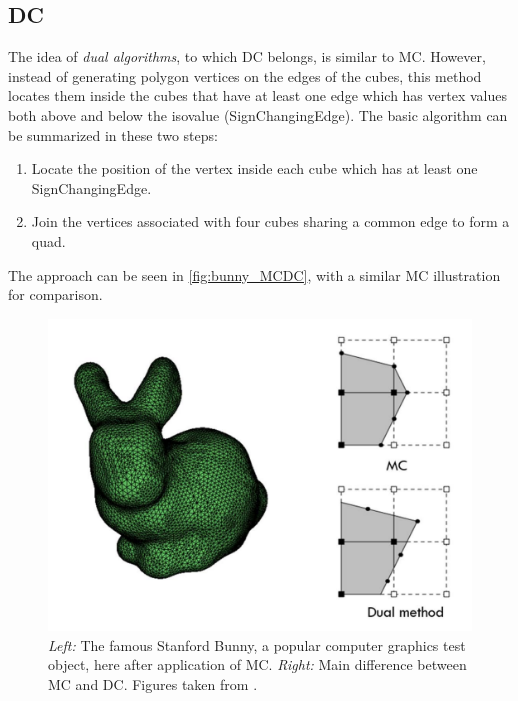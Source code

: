 \subsection{\Acl{DC}}
\label{ssec:DC}
The idea of \emph{dual algorithms}, to which \acf{DC} belongs, is similar to \ac{MC}. However, instead of generating polygon vertices on the edges of the cubes, this method locates them inside the cubes that have at least one edge which has vertex values both above and below the isovalue (\acs{SignChangingEdge}). The basic algorithm can be summarized in these two steps:
\begin{enumerate}
\item Locate the position of the vertex inside each cube which has at least one \ac{SignChangingEdge}.
\item Join the vertices associated with four cubes sharing a common edge to form a \ac{quad}.
\end{enumerate}
The approach can be seen in \autoref{fig:bunny_MCDC}, with a similar \ac{MC} illustration for comparison.

\begin{figure}
\centering
   \includegraphics[width=.5\textwidth]{Pictures/bunny_MC.pdf}
   \caption{\textit{Left:} The famous Stanford Bunny, a popular computer graphics test object, here after application of \ac{MC}. \textit{Right:} Main difference between \ac{MC} and \ac{DC}.  Figures taken from \cite{Hermite2002}. }
   \label{fig:bunny_MCDC}
\end{figure}

